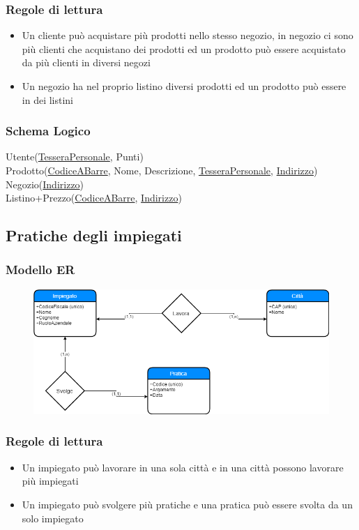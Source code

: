 \documentclass{article}
\begin{document}
	\subsubsection{Regole di lettura}
	\begin{itemize}
		\item Un cliente può acquistare più prodotti nello stesso negozio, in negozio ci sono più clienti che acquistano dei prodotti ed un prodotto può essere acquistato da più clienti in diversi negozi
		\item Un negozio ha nel proprio listino diversi prodotti ed un prodotto può essere in dei listini
	\end{itemize}
	\subsubsection{Schema Logico}
	Utente(\underline{TesseraPersonale}, Punti)\\
	Prodotto(\underline{CodiceABarre}, Nome, Descrizione, \underline{TesseraPersonale}, \underline{Indirizzo})\\
	Negozio(\underline{Indirizzo})\\
	Listino+Prezzo(\underline{CodiceABarre}, \underline{Indirizzo})\\
	
	\pagebreak
	\subsection{Pratiche degli impiegati}
	\subsubsection{Modello ER}
	\begin{figure}[h!]
		\centering
		\includegraphics[scale=0.5]{images/ImpiegatiPratica.png}
	\end{figure}
	\subsubsection{Regole di lettura}
	\begin{itemize}
		\item Un impiegato può lavorare in una sola città e in una città possono lavorare più impiegati
		\item Un impiegato può svolgere più pratiche e una pratica può essere svolta da un solo impiegato
	\end{itemize}
\end{document}
